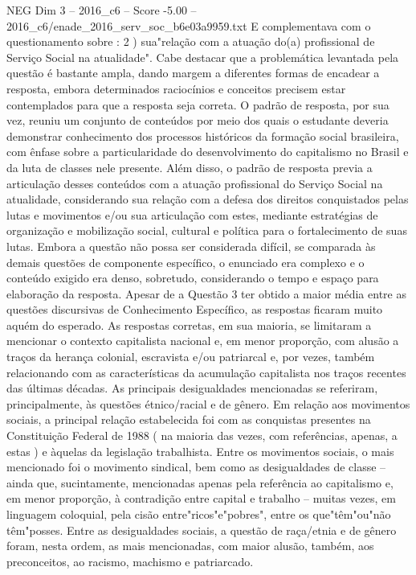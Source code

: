 \begin{textsample}{NEG Dim 3 – 2016\_c6 – Score -5.00 – 2016\_c6/enade\_2016\_serv\_soc\_b6e03a9959.txt}
E complementava com o questionamento sobre : 2 ) sua"relação com a atuação do(a) profissional de Serviço Social na atualidade".
Cabe destacar que a problemática levantada pela questão é bastante ampla, dando margem a diferentes formas de encadear a resposta, embora determinados raciocínios e conceitos precisem estar contemplados para que a resposta seja correta.
O padrão de resposta, por sua vez, reuniu um conjunto de conteúdos por meio dos quais o estudante deveria demonstrar conhecimento dos processos históricos da formação social brasileira, com ênfase sobre a particularidade do desenvolvimento do capitalismo no Brasil e da luta de classes nele presente.
Além disso, o padrão de resposta previa a articulação desses conteúdos com a atuação profissional do Serviço Social na atualidade, considerando sua relação com a defesa dos direitos conquistados pelas lutas e movimentos e/ou sua articulação com estes, mediante estratégias de organização e mobilização social, cultural e política para o fortalecimento de suas lutas.
Embora a questão não possa ser considerada difícil, se comparada às demais questões de componente específico, o enunciado era complexo e o conteúdo exigido era denso, sobretudo, considerando o tempo e espaço para elaboração da resposta.
Apesar de a Questão 3 ter obtido a maior média entre as questões discursivas de Conhecimento Específico, as respostas ficaram muito aquém do esperado.
As respostas corretas, em sua maioria, se limitaram a mencionar o contexto capitalista nacional e, em menor proporção, com alusão a traços da herança colonial, escravista e/ou patriarcal e, por vezes, também relacionando com as características da acumulação capitalista nos traços recentes das últimas décadas.
As principais desigualdades mencionadas se referiram, principalmente, às questões étnico/racial e de gênero.
Em relação aos movimentos sociais, a principal relação estabelecida foi com as conquistas presentes na Constituição Federal de 1988 ( na maioria das vezes, com referências, apenas, a estas ) e àquelas da legislação trabalhista.
Entre os movimentos sociais, o mais mencionado foi o movimento sindical, bem como as desigualdades de classe – ainda que, sucintamente, mencionadas apenas pela referência ao capitalismo e, em menor proporção, à contradição entre capital e trabalho – muitas vezes, em linguagem coloquial, pela cisão entre"ricos"e"pobres", entre os que"têm"ou"não têm"posses.
Entre as desigualdades sociais, a questão de raça/etnia e de gênero foram, nesta ordem, as mais mencionadas, com maior alusão, também, aos preconceitos, ao racismo, machismo e patriarcado.

\end{textsample}
